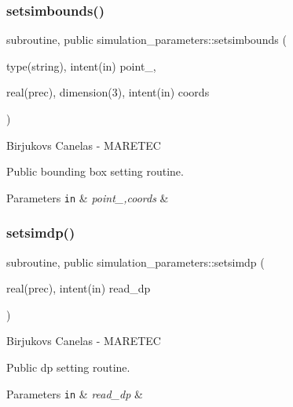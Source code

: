 \subsubsection{\texorpdfstring{setsimbounds()}{setsimbounds()}}
{\footnotesize\ttfamily subroutine, public simulation\+\_\+parameters\+::setsimbounds (\begin{DoxyParamCaption}\item[{type(string), intent(in)}]{point\+\_\+,  }\item[{real(prec), dimension(3), intent(in)}]{coords }\end{DoxyParamCaption})}



Birjukovs Canelas -\/ M\+A\+R\+E\+T\+EC 

Public bounding box setting routine. 
\begin{DoxyParams}[1]{Parameters}
\mbox{\tt in}  & {\em point\+\_\+,coords} & \\
\hline
\end{DoxyParams}
\mbox{\label{namespacesimulation__parameters_a757c1773e1c21deb9f3bfd2dc258bd1a}} 
\subsubsection{\texorpdfstring{setsimdp()}{setsimdp()}}
{\footnotesize\ttfamily subroutine, public simulation\+\_\+parameters\+::setsimdp (\begin{DoxyParamCaption}\item[{real(prec), intent(in)}]{read\+\_\+dp }\end{DoxyParamCaption})}



Birjukovs Canelas -\/ M\+A\+R\+E\+T\+EC 

Public dp setting routine. 
\begin{DoxyParams}[1]{Parameters}
\mbox{\tt in}  & {\em read\+\_\+dp} & \\
\hline
\end{DoxyParams}
\mbox{\label{namespacesimulation__parameters_a21b04e29ccee801263abc6e27fba026f}} 
